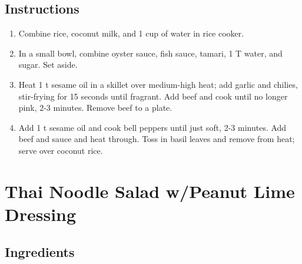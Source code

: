 \documentclass[ansiapaper,10pt,english]{sphinxmanual}
\begin{document}
\section{Instructions}
\label{\detokenize{Thai_Basil_Beef:instructions}}\begin{enumerate}
\item {} 
Combine rice, coconut milk, and 1 cup of water in rice cooker.

\item {} 
In a small bowl, combine oyster sauce, fish sauce, tamari, 1 T water, and sugar.  Set aside.

\item {} 
Heat 1 t sesame oil in a skillet over medium-high heat; add garlic and chilies, stir-frying for 15 seconds until fragrant.  Add beef and cook until no longer pink, 2-3 minutes. Remove beef to a plate.

\item {} 
Add 1 t sesame oil and cook bell peppers until just soft, 2-3 minutes. Add beef and sauce and heat through. Toss in basil leaves and remove from heat; serve over coconut rice.

\end{enumerate}


\chapter{Thai Noodle Salad w/Peanut Lime Dressing}
\label{\detokenize{thai_salad_peanutlime:thai-noodle-salad-w-peanut-lime-dressing}}\label{\detokenize{thai_salad_peanutlime::doc}}

\section{Ingredients}
\label{\detokenize{thai_salad_peanutlime:ingredients}}
\end{document}
